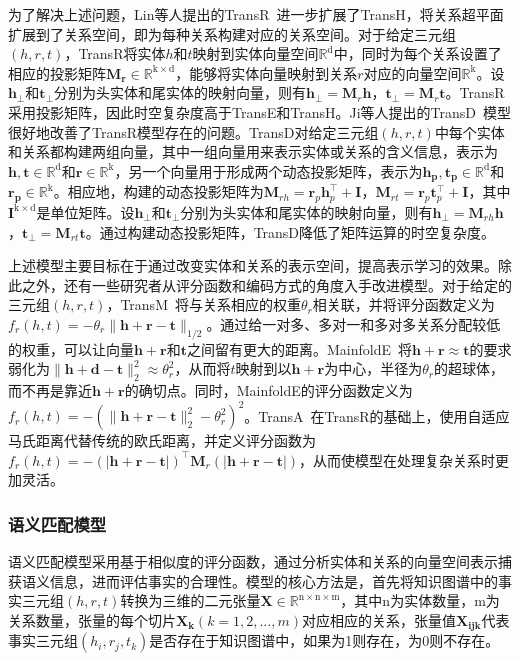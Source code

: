 \documentclass[algorithmlist, AutoFakeBold, AutoFakeSlant, figurelist, tablelist, nomlist, masters]{seuthesix}
\begin{document}
为了解决上述问题，Lin等人提出的TransR~\cite{lin2015learning}进一步扩展了TransH，将关系超平面扩展到了关系空间，即为每种关系构建对应的关系空间。对于给定三元组$\left(h, r, t\right)$，TransR将实体$h$和$t$映射到实体向量空间$\mathbb{R}^{\mathrm{d}}$中，同时为每个关系设置了相应的投影矩阵$\mathbf{M_r} \in \mathbb{R}^\mathrm{k \times d}$，能够将实体向量映射到关系$r$对应的向量空间$\mathbb{R}^{\mathrm{k}}$。设$\bm{h_\perp}$和$\bm{t_\perp}$分别为头实体和尾实体的映射向量，则有$\bm{h}_{\perp}=\bm{M}_r \bm{h}$，$\bm{t}_{\perp} = \bm{M}_r \bm{t}$。TransR采用投影矩阵，因此时空复杂度高于TransE和TransH。Ji等人提出的TransD~\cite{ji2015knowledge}模型很好地改善了TransR模型存在的问题。TransD对给定三元组$\left(h, r, t\right)$中每个实体和关系都构建两组向量，其中一组向量用来表示实体或关系的含义信息，表示为$\bm{h, t} \in \mathbb{R}^{\mathrm{d}}$和$\bm{r} \in \mathbb{R}^{\mathrm{k}}$，另一个向量用于形成两个动态投影矩阵，表示为$\bm{h_p, t_p} \in \mathbb{R}^{\mathrm{d}}$和$\bm{r_p} \in \mathbb{R}^{\mathrm{k}}$。相应地，构建的动态投影矩阵为$\mathbf{M}_{r h} = \bm{r}_p \bm{h}_p^{\top} + \mathbf{I}$，$\mathbf{M}_{r t}=\bm{r}_p \bm{t}_p^{\top} + \mathbf{I}$，其中$\mathbf{I}^{\mathrm{k \times d}}$是单位矩阵。设$\bm{h_\perp}$和$\bm{t_\perp}$分别为头实体和尾实体的映射向量，则有$\bm{h}_{\perp}=\mathbf{M}_{r h} \bm{h}$，$\bm{t}_{\perp}=\mathbf{M}_{r t} \bm{t}$。通过构建动态投影矩阵，TransD降低了矩阵运算的时空复杂度。

上述模型主要目标在于通过改变实体和关系的表示空间，提高表示学习的效果。除此之外，还有一些研究者从评分函数和编码方式的角度入手改进模型。对于给定的三元组$\left(h, r, t\right)$，TransM~\cite{fan2014transition}将与关系相应的权重$\theta_r$相关联，并将评分函数定义为$f_r(h, t)=-\theta_r\|\bm{h} + \bm{r} - \bm{t}\|_{1 / 2}$。通过给一对多、多对一和多对多关系分配较低的权重，可以让向量$\bm{h} + \bm{r}$和$\bm{t}$之间留有更大的距离。MainfoldE~\cite{xiao2016one}将$\bm{h} + \bm{r} \approx \bm{t}$的要求弱化为$\|\bm{h} + \bm{d} - \bm{t}\|_2^2 \approx \theta_r^2$，从而将$t$映射到以$\bm{h} + \bm{r}$为中心，半径为$\theta_r$的超球体，而不再是靠近$\bm{h} + \bm{r}$的确切点。同时，MainfoldE的评分函数定义为$f_r(h, t) = -\left(\|\bm{h} + \bm{r} - \bm{t}\|_2^2 - \theta_r^2\right)^2$。TransA~\cite{xiao2015transa}在TransR的基础上，使用自适应马氏距离代替传统的欧氏距离，并定义评分函数为$f_r(h, t) = -(|\bm{h} + \bm{r} - \bm{t}|)^{\top} \mathbf{M}_r(|\bm{h} + \bm{r} - \bm{t}|)$，从而使模型在处理复杂关系时更加灵活。

\subsubsection{语义匹配模型}
语义匹配模型采用基于相似度的评分函数，通过分析实体和关系的向量空间表示捕获语义信息，进而评估事实的合理性。模型的核心方法是，首先将知识图谱中的事实三元组$\left(h, r, t\right)$转换为三维的二元张量$\mathbf{X} \in \mathbb{R}^{\mathrm{n \times n \times m}}$，其中n为实体数量，m为关系数量，张量的每个切片$\mathbf{X_k}(k=1,2, \ldots, m)$对应相应的关系，张量值$\mathbf{X_{i j k}}$代表事实三元组$\left(h_i, r_j, t_k\right)$是否存在于知识图谱中，如果为1则存在，为0则不存在。
\end{document}
